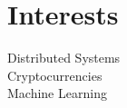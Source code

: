\documentclass[letterpaper]{deedy-resume} %
\begin{document}
\begin{minipage}[t]{0.33\textwidth}
\section{Interests}
Distributed Systems \\
Cryptocurrencies \\
Machine Learning

\sectionspace %


\end{minipage} %
\hfill
%
%
\end{document}

